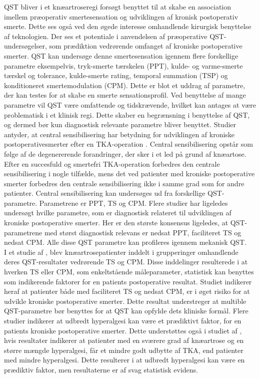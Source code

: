 QST bliver i et knæartroseregi forsøgt benyttet til at skabe en association imellem præoperativ smertesensation og udviklingen af kronisk postoperativ smerte. Dette ses også ved den øgede interesse omhandlende kirurgisk benyttelse af teknologien. Der ses et potentiale i anvendelsen af præoperative QST-undersøgelser, som prædiktion vedrørende omfanget af kroniske postoperative smerter. \citep{Wylde2013} QST kan undersøge denne smertesensation igennem flere forskellige parametre eksempelvis, tryk-smerte tærskelen (PPT), kulde- og varme-smerte tærskel og tolerance, kulde-smerte rating, temporal summation (TSP) og konditioneret smertemodulation (CPM). \citep{Cornelius2015} Dette er blot et uddrag af parametre, der kan testes for at skabe en smerte sensationsprofil. Ved benyttelse af mange parametre vil QST være omfattende og tidskrævende, hvilket kan antages at være problematisk i et klinisk regi. Dette skaber en begrænsning i benyttelse af QST, og dermed bør kun diagnostisk relevante parametre bliver benyttet. \citep{Nielsen2009} Studier antyder, at central sensibilisering har betydning for udviklingen af kroniske postoperativesmerter efter en TKA-operation \citep{Suokas2012}. Central sensibilisering opstår som følge af de degenererende forandringer, der sker i et led på grund af knæartose. \citep{Arendt-Nielsen2015}  Efter en succesfuld og smertefri TKA-operation forbedres den centrale sensibilisering i nogle tilfælde, mens det ved patienter med kroniske postoperative smerter forbedres den centrale sensibilisering ikke i samme grad som for andre patienter. \citep{Arendt-Nielsen2015} Central sensibilisering kan undersøges ud fra forskellige QST-parametre. Parametrene er PPT, TS og CPM. \citep{Arendt-Nielsen2015} Flere studier har ligeledes undersøgt hvilke parametre, som er diagnostisk relateret til udviklingen af kroniske postoperative smerter. Her er den største konsensus ligeledes, at QST-parametrene med størst diagnostisk relevans er nedsat PPT, faciliteret TS og nedsat CPM. Alle disse QST parametre kan profileres igennem mekanisk QST. \citep{Petersen2015} \citep{Petersen2016} \citep{Wylde2015} \\
I et studie af , blev knæartrosepatienter inddelt i grupperinger omhandlende deres QST-resultater vedrørende TS og CPM. Disse inddelinger resulterede i at hverken TS eller CPM, som enkeltstående måleparameter, statistisk kan benyttes som indikerende faktorer for en patients postoperative resultat. Studiet indikerer heraf at patienter både med faciliteret TS og nedsat CPM, er i øget risiko for at udvikle kroniske postoperative smerter. Dette resultat understreger at multible QST-parametre bør benyttes for at QST kan opfylde dets kliniske formål. \citep{Petersen2016} Flere studier indikerer at udbredt hyperalgesi kan være et prædiktivt faktor, for en patients kroniske postoperative smerter. \citep{Petersen2016} \citep{Wylde2013} Dette understøttes også i studiet af , hvis resultater indikerer at patienter med en sværere grad af knæartrose og en større mængde hyperalgesi, får et mindre godt udbytte af TKA, end patienter med mindre hyperalgesi. Dette resulterer i at udbredt hyperalgesi kan være en prædiktiv faktor, men resultaterne er af svag statistisk evidens. \citep{Wylde2016c}
